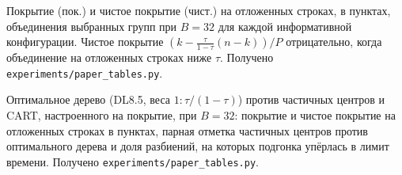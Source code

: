 \documentclass[11pt]{article}
\begin{document}
\begin{table}[p]\centering\scriptsize\setlength{\tabcolsep}{3pt}
\caption{Покрытие (пок.) и чистое покрытие (чист.) на отложенных строках, в пунктах, объединения выбранных групп при $B=32$ для каждой информативной конфигурации. Чистое покрытие $(k-\tfrac{\tau}{1-\tau}(n-k))/P$ отрицательно, когда объединение на отложенных строках ниже $\tau$. Получено \texttt{experiments/paper\_tables.py}.}\label{tab:net32}

\end{table}

\begin{table}[p]\centering\scriptsize\setlength{\tabcolsep}{3pt}
\caption{Оптимальное дерево (DL8.5, веса $1:\tau/(1-\tau)$) против частичных центров и CART, настроенного на покрытие, при $B=32$: покрытие и чистое покрытие на отложенных строках в пунктах, парная отметка частичных центров против оптимального дерева и доля разбиений, на которых подгонка упёрлась в лимит времени. Получено \texttt{experiments/paper\_tables.py}.}\label{tab:treeopt}

\end{table}



\end{document}
